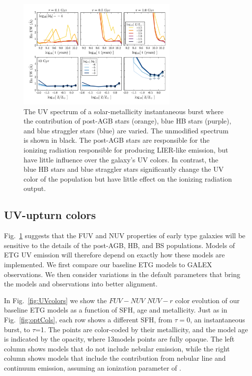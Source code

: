 \begin{figure}
  \begin{center}
    \includegraphics[width=0.7\textwidth]{figs/f13.png}
    \caption{The UV spectrum of a solar-metallicity instantaneous burst where the contribution of post-AGB stars (orange), blue HB stars (purple), and blue straggler stars (blue) are varied. The unmodified spectrum is shown in black. The post-AGB stars are responsible for the ionizing radiation responsible for producing LIER-like emission, but have little influence over the galaxy's UV colors. In contrast, the blue HB stars and blue straggler stars significantly change the UV color of the population but have little effect on the ionizing radiation output.}
    \label{fig:HPHB}
  \end{center}
\end{figure}

\subsection{UV-upturn colors}

Fig.~\ref{fig:HPHB} suggests that the FUV and NUV properties of early type galaxies will be sensitive to the details of the post-AGB, HB, and BS populations. Models of ETG UV emission will therefore depend on exactly how these models are implemented. We first compare our baseline ETG models to GALEX observations. We then consider variations in the default \FSPS parameters that bring the models and observations into better alignment.

In Fig.~\ref{fig:UVcolors} we show the $FUV-NUV$ \emph{\vs} $NUV-r$ color evolution of our baseline ETG models as a function of SFH, age and metallicity. Just as in Fig.~\ref{fig:optCols}, each row shows a different SFH, from $\tau=0$, an instantaneous burst, to $\tau$=1\Gyr. The points are color-coded by their metallicity, and the model age is indicated by the opacity, where 13\Gyr models points are fully opaque. The left column shows models that do not include nebular emission, while the right column shows models that include the contribution from nebular line and continuum emission, assuming an ionization parameter of .

